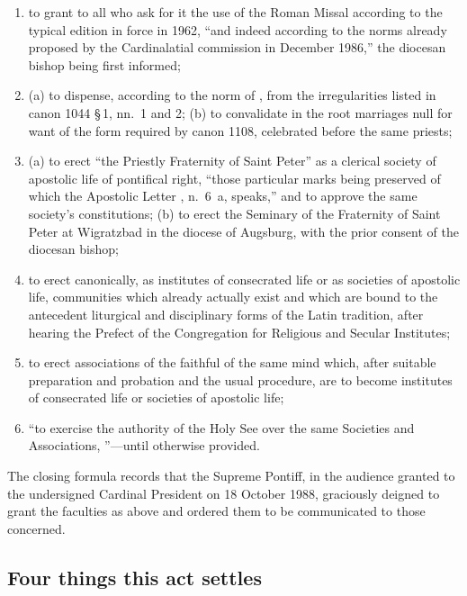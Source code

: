 \begin{enumerate}
\item to grant to all who ask for it the use of the Roman Missal
according to the typical edition in force in 1962, ``and indeed according
to the norms already proposed by the Cardinalatial commission
 in December 1986,'' the diocesan bishop
being first informed;
\item (a) to dispense, according to the norm of ,
from the irregularities listed in canon 1044 §\,1, nn.~1 and 2; (b) to
convalidate in the root marriages null for want of the form required by
canon 1108, celebrated before the same priests;
\item (a) to erect ``the Priestly Fraternity of Saint Peter'' as a
clerical society of apostolic life of pontifical right, ``those
particular marks being preserved of which the Apostolic Letter
, n.~6~a, speaks,'' and to approve the same society's
constitutions; (b) to erect the Seminary of the Fraternity of Saint Peter
at Wigratzbad in the diocese of Augsburg, with the prior consent of the
diocesan bishop;
\item to erect canonically, as institutes of consecrated life or as
societies of apostolic life, communities which already actually exist and
which are bound to the antecedent liturgical and disciplinary forms of
the Latin tradition, after hearing the Prefect of the Congregation for
Religious and Secular Institutes;
\item to erect associations of the faithful of the same mind which, after
suitable preparation and probation and the usual procedure, are to become
institutes of consecrated life or societies of apostolic life;
\item ``to exercise the authority of the Holy See over the same Societies
and Associations, ''---until otherwise
provided.
\end{enumerate}

The closing formula records that the Supreme Pontiff, in the audience
granted to the undersigned Cardinal President on 18 October 1988,
graciously deigned to grant the faculties as above and ordered them to be
communicated to those concerned.

\subsection{Four things this act settles}

